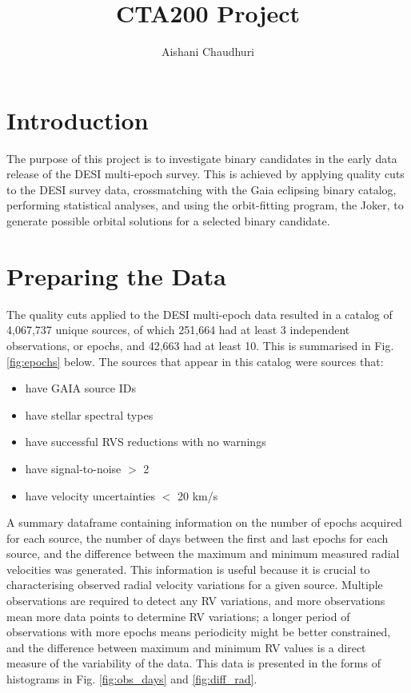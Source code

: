 \documentclass[12pt,a4paper]{article}
\title{CTA200 Project}
\author{Aishani Chaudhuri}
\begin{document}
\date{\vspace{-5ex}}  %
\maketitle

\section{Introduction}
The purpose of this project is to investigate binary candidates in the early data release of the DESI multi-epoch survey. This is achieved by applying quality cuts to the DESI survey data, crossmatching with the Gaia eclipsing binary catalog, performing statistical analyses, and using the orbit-fitting program, the Joker, to generate possible orbital solutions for a selected binary candidate.



\section{Preparing the Data}
The quality cuts applied to the DESI multi-epoch data resulted in a catalog of 4,067,737 unique sources, of which 251,664 had at least 3 independent observations, or epochs, and 42,663 had at least 10. This is summarised in Fig. \ref{fig:epochs} below. The sources that appear in this catalog were sources that:
\begin{itemize}
  \item have GAIA source IDs
  \item have stellar spectral types
  \item have successful RVS reductions with no warnings
  \item have signal-to-noise $>$ 2
  \item have velocity uncertainties $<$ 20 km/s
\end{itemize}

A summary dataframe containing information on the number of epochs acquired for each source, the number of days between the first and last epochs for each source, and the difference between the maximum and minimum measured radial velocities was generated. This information is useful because it is crucial to characterising observed radial velocity variations for a given source. Multiple observations are required to detect any RV variations, and more observations mean more data points to determine RV variations; a longer period of observations with more epochs means periodicity might be better constrained, and the difference between maximum and minimum RV values is a direct measure of the variability of the data. This data is presented in the forms of histograms in Fig. \ref{fig:obs_days} and \ref{fig:diff_rad}.
\end{document}

